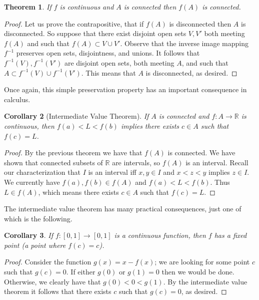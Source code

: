 \documentclass[11pt,oneside]{amsbook}
\newcommand{\R}{\mathbb R}
\theoremstyle{definition}
\theoremstyle{plain}
\newtheorem{theorem}{Theorem}[section]
\newtheorem{corollary}[theorem]{Corollary}
\theoremstyle{definition}
\theoremstyle{remark}
\numberwithin{equation}{section}
\numberwithin{figure}{section}
\begin{document}
\begin{theorem}
  If $f$ is continuous and $A$ is connected then $f(A)$ is connected.
\end{theorem}

\begin{proof}
  Let us prove the contrapositive, that if $f(A)$ is disconnected then $A$ is disconnected. So suppose that there exist disjoint open sets $V,V'$ both meeting $f(A)$ and such that $f(A)\subset V\cup V'$. Observe that the inverse image mapping $f^{-1}$ preserves open sets, disjointness, and unions. It follows that $f^{-1}(V),f^{-1}(V')$ are disjoint open sets, both meeting $A$, and such that $A\subset f^{-1}(V)\cup f^{-1}(V')$. This means that $A$ is disconnected, as desired.
\end{proof}

Once again, this simple preservation property has an important consequence in calculus.

\begin{corollary}[Intermediate Value Theorem]
  If $A$ is connected and $f\colon A\to\R$ is continuous, then $f(a)<L<f(b)$ implies there exists $c\in A$ such that $f(c)=L$.
\end{corollary}

\begin{proof}
  By the previous theorem we have that $f(A)$ is connected. We have shown that connected subsets of $\R$ are intervals, so $f(A)$ is an interval. Recall our characterization that $I$ is an interval iff $x,y\in I$ and $x<z<y$ implies $z\in I$. We currently have $f(a),f(b)\in f(A)$ and $f(a)<L<f(b)$. Thus $L\in f(A)$, which means there exists $c\in A$ such that $f(c)=L$.
\end{proof}

The intermediate value theorem has many practical consequences, just one of which is the following.

\begin{corollary}
  If $f\colon[0,1]\to[0,1]$ is a continuous function, then $f$ has a fixed point (a point where $f(c)=c$).
\end{corollary}

\begin{proof}
  Consider the function $g(x)=x-f(x)$; we are looking for some point $c$ such that $g(c)=0$. If either $g(0)$ or $g(1)=0$ then we would be done. Otherwise, we clearly have that $g(0)<0<g(1)$. By the intermediate value theorem it follows that there exists $c$ such that $g(c)=0$, as desired.
\end{proof}
\end{document}
